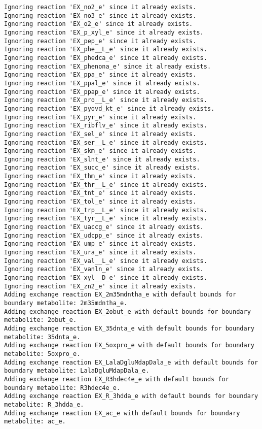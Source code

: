 \documentclass[
  letterpaper,
  DIV=11,
  numbers=noendperiod]{scrartcl}
\begin{document}
\begin{verbatim}
Ignoring reaction 'EX_no2_e' since it already exists.
Ignoring reaction 'EX_no3_e' since it already exists.
Ignoring reaction 'EX_o2_e' since it already exists.
Ignoring reaction 'EX_p_xyl_e' since it already exists.
Ignoring reaction 'EX_pep_e' since it already exists.
Ignoring reaction 'EX_phe__L_e' since it already exists.
Ignoring reaction 'EX_phedca_e' since it already exists.
Ignoring reaction 'EX_phenona_e' since it already exists.
Ignoring reaction 'EX_ppa_e' since it already exists.
Ignoring reaction 'EX_ppal_e' since it already exists.
Ignoring reaction 'EX_ppap_e' since it already exists.
Ignoring reaction 'EX_pro__L_e' since it already exists.
Ignoring reaction 'EX_pyovd_kt_e' since it already exists.
Ignoring reaction 'EX_pyr_e' since it already exists.
Ignoring reaction 'EX_ribflv_e' since it already exists.
Ignoring reaction 'EX_sel_e' since it already exists.
Ignoring reaction 'EX_ser__L_e' since it already exists.
Ignoring reaction 'EX_skm_e' since it already exists.
Ignoring reaction 'EX_slnt_e' since it already exists.
Ignoring reaction 'EX_succ_e' since it already exists.
Ignoring reaction 'EX_thm_e' since it already exists.
Ignoring reaction 'EX_thr__L_e' since it already exists.
Ignoring reaction 'EX_tnt_e' since it already exists.
Ignoring reaction 'EX_tol_e' since it already exists.
Ignoring reaction 'EX_trp__L_e' since it already exists.
Ignoring reaction 'EX_tyr__L_e' since it already exists.
Ignoring reaction 'EX_uaccg_e' since it already exists.
Ignoring reaction 'EX_udcpp_e' since it already exists.
Ignoring reaction 'EX_ump_e' since it already exists.
Ignoring reaction 'EX_ura_e' since it already exists.
Ignoring reaction 'EX_val__L_e' since it already exists.
Ignoring reaction 'EX_vanln_e' since it already exists.
Ignoring reaction 'EX_xyl__D_e' since it already exists.
Ignoring reaction 'EX_zn2_e' since it already exists.
Adding exchange reaction EX_2m35mdntha_e with default bounds for boundary metabolite: 2m35mdntha_e.
Adding exchange reaction EX_2obut_e with default bounds for boundary metabolite: 2obut_e.
Adding exchange reaction EX_35dnta_e with default bounds for boundary metabolite: 35dnta_e.
Adding exchange reaction EX_5oxpro_e with default bounds for boundary metabolite: 5oxpro_e.
Adding exchange reaction EX_LalaDgluMdapDala_e with default bounds for boundary metabolite: LalaDgluMdapDala_e.
Adding exchange reaction EX_R3hdec4e_e with default bounds for boundary metabolite: R3hdec4e_e.
Adding exchange reaction EX_R_3hdda_e with default bounds for boundary metabolite: R_3hdda_e.
Adding exchange reaction EX_ac_e with default bounds for boundary metabolite: ac_e.

\end{verbatim}
\end{document}

